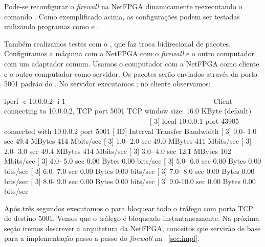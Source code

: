 Pode-se reconfigurar o \emph{firewall} na NetFPGA dinamicamente
reexecutando o comando .  Como exemplificado acima, as
configurações podem ser testadas utilizando programas como 
e .

Também realizamos testes com o , que faz troca bidirecional
de pacotes. Configuramos a máquina com a NetFPGA com o \emph{firewall} e
o outro computador com um adaptador comum. Usamos o computador com a
NetFPGA como cliente e o outro computador como servidor. Os pacotes
serão enviados através da porta 5001 padrão do .  No servidor
executamos ; no cliente observamos:

\begin{verbnobox}[\small]
iperf -c 10.0.0.2 -i 1
------------------------------------------------------------
Client connecting to 10.0.0.2, TCP port 5001
TCP window size: 16.0 KByte (default)
------------------------------------------------------------
[  3] local 10.0.0.1 port 43905 connected with 10.0.0.2 port 5001
[ ID] Interval       Transfer     Bandwidth
[  3]  0.0- 1.0 sec  49.4 MBytes   414 Mbits/sec
[  3]  1.0- 2.0 sec  49.0 MBytes   411 Mbits/sec
[  3]  2.0- 3.0 sec  49.4 MBytes   414 Mbits/sec
[  3]  3.0- 4.0 sec  12.1 MBytes   102 Mbits/sec
[  3]  4.0- 5.0 sec  0.00 Bytes  0.00 bits/sec
[  3]  5.0- 6.0 sec  0.00 Bytes  0.00 bits/sec
[  3]  6.0- 7.0 sec  0.00 Bytes  0.00 bits/sec
[  3]  7.0- 8.0 sec  0.00 Bytes  0.00 bits/sec
[  3]  8.0- 9.0 sec  0.00 Bytes  0.00 bits/sec
[  3]  9.0-10.0 sec  0.00 Bytes  0.00 bits/sec
\end{verbnobox}

Após três segundos executamos o  para bloquear todo o tráfego
com porta TCP de destino 5001.  Vemos que o tráfego é bloqueado
instantaneamente. Na próxima seção iremos descrever a arquitetura da
NetFPGA, conceitos que servirão de base para a implementação
passo-a-passo do \emph{firewall} na \secstr~\ref{sec:impl}.



